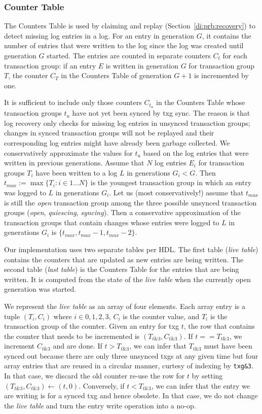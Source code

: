 \documentclass[12pt,a4paper,twoside]{book}
\begin{document}
\subsubsection{Counter Table}\label{di:prb:write:logstructureencoding}
The Counters Table is used by claiming and replay (Section~\ref{di:prb:recovery}) to detect missing log entries in a log.
For an entry in generation $G$, it contains the number of entries that were written to the log since the log was created until generation $G$ started.
The entries are counted in separate counters $C_t$ for each transaction group:
if an entry $E$ is written in generation $G$ for transaction group $T$, the counter $C_T$ in the Counters Table of generation $G+1$ is incremented by one.

It is sufficient to include only those counters $C_{t_{u}}$ in the Counters Table whose transaction groups $t_u$ have not yet been synced by txg sync.
The reason is that log recovery only checks for missing log entries in unsynced transaction groups; changes in synced transaction groups will not be replayed and their corresponding log entries might have already been garbage collected.
We conservatively approximate the values for $t_u$ based on the log entries that were written in previous generations.
Assume that $N$ log entries $E_i$ for transaction groups $T_i$ have been written to a log $L$ in generations $G_i < G$.
Then $t_{max} := \max \{ T_i : i \in 1 \dots N \}$ is the youngest transaction group in which an entry was logged to $L$ in generations $G_i$.
Let us (most conservatively!) assume that $t_{max}$ is still the \textit{open} transaction group among the three possible unsynced transaction groups (\textit{open}, \textit{quiescing}, \textit{syncing}).
Then a conservative approximation of the transaction groups that contain changes whose entries were logged to $L$ in generations $G_i$ is $\{ t_{max}, t_{max}-1, t_{max}-2 \}$.

Our implementation uses two separate tables per HDL.
The first table (\textit{live table}) contains the counters that are updated as new entries are being written.
The second table (\textit{last table}) is the Counters Table for the entries that are being written.
It is computed from the state of the \textit{live table} when the currently open generation was started.

We represent the \textit{live table} as an array of four elements.
Each array entry is a tuple $(T_i, C_i)$ where $i \in {0,1,2,3}$, $C_i$ is the counter value, and $T_i$ is the transaction group of the counter.
Given an entry for txg $t$, the row that contains the counter that needs to be incremented is $(T_{t\&3}, C_{t\&3})$.
If $t == T_{t\&3}$, we increment $C_{t\&3}$ and are done.
If $t > T_{t\&3}$, we can infer that $T_{t\&3}$ must have been synced out because there are only three unsynced txgs at any given time but four array entries that are reused in a circular manner, curtesy of indexing by \lstinline{txg&3}.
In that case, we discard the old counter re-use the row for $t$ by setting $(T_{t\&3}, C_{t\&3}) \leftarrow (t, 0)$.
Conversely, if $t < T_{t\&3}$, we can infer that the entry we are writing is for a synced txg and hence obsolete.
In that case, we do not change the \textit{live table} and turn the entry write operation into a no-op.
\end{document}
